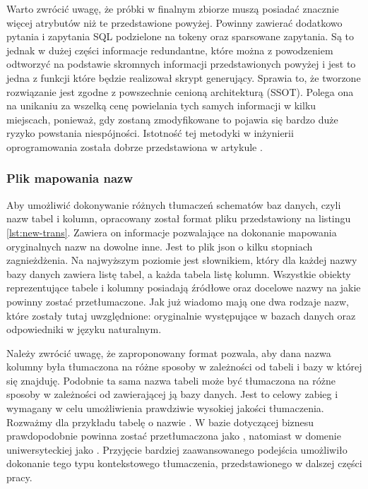 Warto zwrócić uwagę, że próbki w finalnym zbiorze muszą posiadać znacznie więcej atrybutów niż te przedstawione powyżej. Powinny zawierać dodatkowo pytania i zapytania SQL podzielone na tokeny oraz sparsowane zapytania. Są to jednak w dużej części informacje redundantne, które można z powodzeniem odtworzyć na podstawie skromnych informacji przedstawionych powyżej i jest to jedna z funkcji które będzie realizował skrypt generujący. Sprawia to, że tworzone rozwiązanie jest zgodne z powszechnie cenioną architekturą  (SSOT). Polega ona na unikaniu za wszelką cenę powielania tych samych informacji w kilku miejscach, ponieważ, gdy zostaną zmodyfikowane to pojawia się bardzo duże ryzyko powstania niespójności. Istotność tej metodyki w inżynierii oprogramowania została dobrze przedstawiona w artykule  \cite{Pang2014}.

\subsubsection{Plik mapowania nazw}
Aby umożliwić dokonywanie różnych tłumaczeń schematów baz danych, czyli nazw tabel i kolumn, opracowany został format pliku przedstawiony na listingu \ref{lst:new-trans}. Zawiera on informacje pozwalające na dokonanie mapowania oryginalnych nazw na dowolne inne. Jest to plik json o kilku stopniach zagnieżdżenia. Na najwyższym poziomie jest słownikiem, który dla każdej nazwy bazy danych zawiera listę tabel, a każda tabela listę kolumn. Wszystkie obiekty reprezentujące tabele i kolumny posiadają źródłowe oraz docelowe nazwy na jakie powinny zostać przetłumaczone. Jak już wiadomo mają one dwa rodzaje nazw, które zostały tutaj uwzględnione: oryginalnie występujące w bazach danych oraz odpowiedniki w języku naturalnym.

\begin{minipage}{\linewidth}

\end{minipage}

Należy zwrócić uwagę, że zaproponowany format pozwala, aby dana nazwa kolumny była tłumaczona na różne sposoby w zależności od tabeli i bazy w której się znajduję. Podobnie ta sama nazwa tabeli może być tłumaczona na różne sposoby w zależności od zawierającej ją bazy danych. Jest to celowy zabieg i wymagany w celu umożliwienia prawdziwie wysokiej jakości tłumaczenia. Rozważmy dla przykładu tabelę o nazwie . W bazie dotyczącej biznesu prawdopodobnie powinna zostać przetłumaczona jako , natomiast w domenie uniwersyteckiej jako . Przyjęcie bardziej zaawansowanego podejścia umożliwiło dokonanie tego typu kontekstowego tłumaczenia, przedstawionego w dalszej części pracy.

